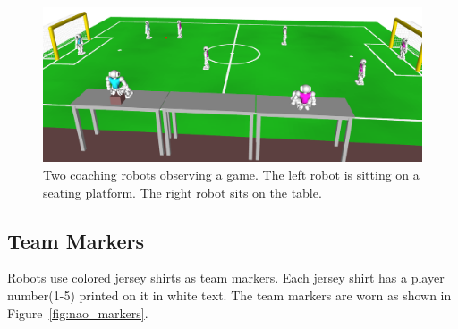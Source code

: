 \documentclass[12pt]{article}
\begin{document}
\begin{figure}[t]
\centerline{\includegraphics[width=\columnwidth]{figs/coaching-robots}}
\caption{Two coaching robots observing a game. The left robot is sitting on a seating platform. The right robot sits on the table.}
\label{fig:coaches}
\end{figure}
 

\subsection{Team Markers}
\label{sec:team_markers}

Robots use colored jersey shirts as team markers. Each jersey shirt has a player number(1-5) printed on it in white text.  The team markers are worn as shown in Figure~\ref{fig:nao_markers}.
\end{document}
